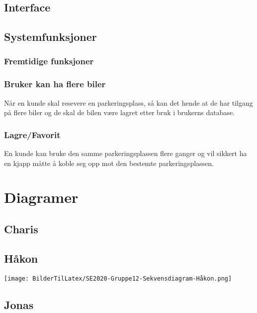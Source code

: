 \documentclass[12pt]{article}
\begin{document}
    \subsection{Interface}

    \subsection{Systemfunksjoner}

        \subsubsection{Fremtidige funksjoner}

            \subsubsection{Bruker kan ha flere biler}
            Når en kunde skal resevere en parkeringsplass, så kan det hende at de har tilgang på flere biler og de skal de bilen være lagret etter bruk i brukerns database.

            \subsubsection{Lagre/Favorit}
            En kunde kan bruke den samme parkeringsplassen flere ganger og vil sikkert ha en kjapp måtte å koble seg opp mot den bestemte parkeringsplassen.

\section{Diagramer}

    \subsection{Charis}

    \newpage
    \subsection{Håkon}

    \texttt{[image: BilderTilLatex/SE2020-Gruppe12-Sekvensdiagram-Håkon.png]}


    \subsection{Jonas}
\end{document}
